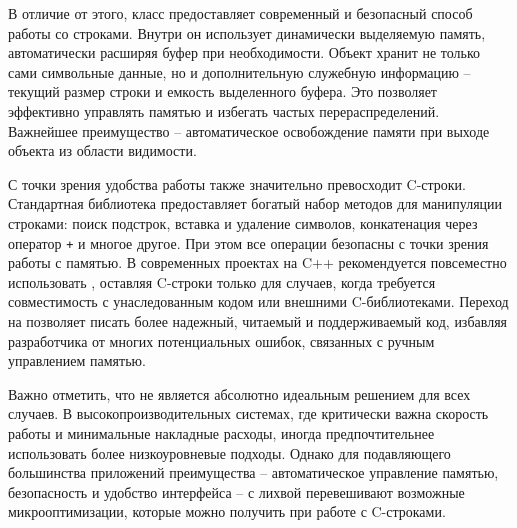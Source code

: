 В отличие от этого, класс  предоставляет современный и безопасный способ работы со строками. Внутри он использует динамически выделяемую память, 
автоматически расширяя буфер при необходимости. Объект  хранит не только сами символьные данные, но и дополнительную служебную информацию -- текущий 
размер строки и емкость выделенного буфера. Это позволяет эффективно управлять памятью и избегать частых перераспределений. Важнейшее преимущество  -- 
автоматическое освобождение памяти при выходе объекта из области видимости.

С точки зрения удобства работы  также значительно превосходит C-строки. Стандартная библиотека предоставляет богатый набор методов для манипуляции 
строками: поиск подстрок, вставка и удаление символов, конкатенация через оператор \verb|+| и многое другое. При этом все операции безопасны с точки зрения работы с памятью. 
В современных проектах на C++ рекомендуется повсеместно использовать , оставляя C-строки только для случаев, когда требуется совместимость с 
унаследованным кодом или внешними C-библиотеками. Переход на  позволяет писать более надежный, читаемый и поддерживаемый код, избавляя разработчика от 
многих потенциальных ошибок, связанных с ручным управлением памятью.

Важно отметить, что  не является абсолютно идеальным решением для всех случаев. В высокопроизводительных системах, где критически важна скорость работы и 
минимальные накладные расходы, иногда предпочтительнее использовать более низкоуровневые подходы. Однако для подавляющего большинства приложений преимущества 
-- автоматическое управление памятью, безопасность и удобство интерфейса -- с лихвой перевешивают возможные микрооптимизации, которые можно получить при работе с C-строками.